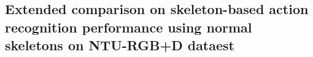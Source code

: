 \documentclass[runningheads]{llncs}
\begin{document}
\subsection{Extended comparison on skeleton-based action recognition performance using normal skeletons on NTU-RGB+D dataest}
\label{apx:5}
\begin{table*}[h]
\vspace{-6ex}
	\centering
		\caption{Performance comparison on NTU-RGB+D dataset and Kinetics-skeleton dataset. '-' indicates that the result were not reported.  indicates that model is trained by ourselves and figures in parentheses means reported accuracy. The boldface figures denote the highest performance for each experiment.}
\end{table*}
\end{document}

